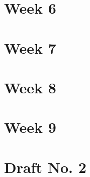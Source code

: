 \documentclass[t]{beamer}
\begin{document}
    \section*{Week 6}


    \section*{Week 7}


    \section*{Week 8}


	\section*{Week 9}

	\section{Draft No. 2}
    
\end{document}
